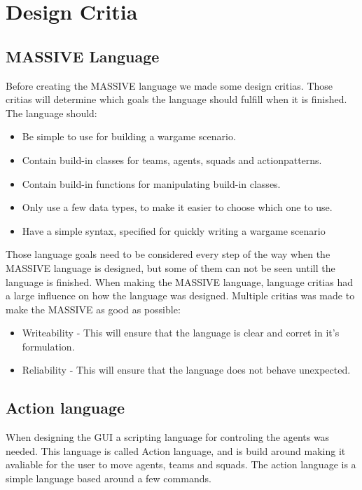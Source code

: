 \section{Design Critia}
\label{sec:designcrit}

\subsection{MASSIVE Language}
Before creating the MASSIVE language we made some design critias. Those critias will determine which goals the language should fulfill when it is finished. The language should:

\begin{itemize}
	\item Be simple to use for building a wargame scenario.
	\item Contain build-in classes for teams, agents, squads and actionpatterns.
	\item Contain build-in functions for manipulating build-in classes.
	\item Only use a few data types, to make it easier to choose which one to use.
	\item Have a simple syntax, specified for quickly writing a wargame scenario
\end{itemize}

Those language goals need to be considered every step of the way when the MASSIVE language is designed, but some of them can not be seen untill the language is finished.
When making the MASSIVE language, language critias had a large influence on how the language was designed. Multiple critias was made to make the MASSIVE as good as possible:

\begin{itemize}
	\item Writeability - This will ensure that the language is clear and corret in it's formulation.
	\item Reliability - This will ensure that the language does not behave unexpected.
\end{itemize}

\subsection{Action language}
When designing the GUI a scripting language for controling the agents was needed. This language is called Action language, and is build around making it avaliable for the user to move agents, teams and squads.
The action language is a simple language based around a few commands.

